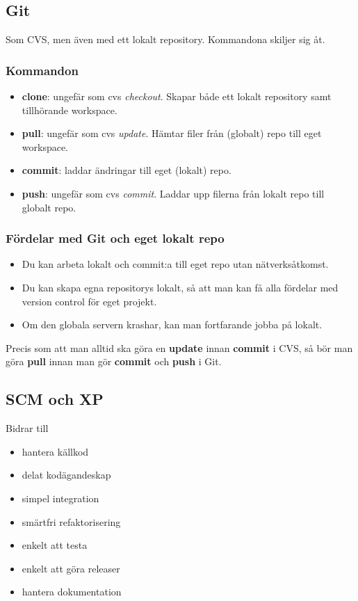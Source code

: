 \documentclass[a4paper]{article}
\begin{document}
\subsection{Git}
Som CVS, men även med ett lokalt repository. Kommandona skiljer sig åt.
\subsubsection{Kommandon}
\begin{itemize}
\item{\textbf{clone}: ungefär som cvs \emph{checkout}. Skapar både ett lokalt repository samt tillhörande workspace.}
\item{\textbf{pull}: ungefär som cvs \emph{update}. Hämtar filer från (globalt) repo till eget workspace.}
\item{\textbf{commit}: laddar ändringar till eget (lokalt) repo.}
\item{\textbf{push}: ungefär som cvs \emph{commit}. Laddar upp filerna från lokalt repo till globalt repo.}
\end{itemize}
\subsubsection{Fördelar med Git och eget lokalt repo}
\begin{itemize}
\item{Du kan arbeta lokalt och commit:a till eget repo utan nätverksåtkomst.}
\item{Du kan skapa egna repositorys lokalt, så att man kan få alla fördelar med version control för eget projekt.}
\item{Om den globala servern krashar, kan man fortfarande jobba på lokalt.}
\end{itemize}
\begin{tips}[]
Precis som att man alltid ska göra en \textbf{update} innan \textbf{commit} i CVS, så bör man göra \textbf{pull} innan man gör \textbf{commit} och \textbf{push} i Git.
\end{tips}

\subsection{SCM och XP}
Bidrar till
\begin{itemize}
\item{hantera källkod}
\item{delat kodägandeskap}
\item{simpel integration}
\item{smärtfri refaktorisering}
\item{enkelt att testa}
\item{enkelt att göra releaser}
\item{hantera dokumentation}
\end{itemize}
\end{document}
